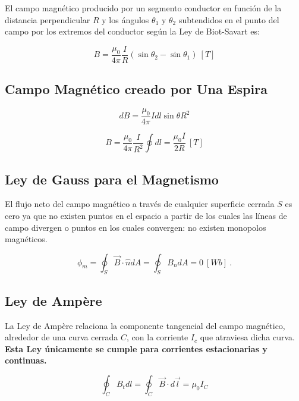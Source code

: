 \documentclass{tufte-handout}
\begin{document}
El campo magnético producido por un segmento conductor en función de la distancia perpendicular $R$ y los ángulos $\theta_1$ y $\theta_2$ subtendidos en el punto del campo por los extremos del conductor según la Ley de Biot-Savart es:

\begin{equation}
B = \frac{\mu_0}{4\pi}\frac{I}{R}(\sin{\theta_2}-\sin{\theta_1})~[T]
\end{equation}

\subsection{Campo Magnético creado por Una Espira}

\begin{equation}
dB = \frac{\mu_0}{4\pi}{Idl\sin{\theta}}{R^2}
\end{equation}

\begin{equation}
B = \frac{\mu_0}{4\pi}\frac{I}{R^2}\oint dl = \frac{\mu_0 I}{2R}~[T]
\end{equation}

\subsection{Ley de Gauss para el Magnetismo}

El flujo neto del campo magnético a través de cualquier superficie cerrada $S$ es cero ya que no existen puntos en el espacio a partir de los cuales las líneas de campo divergen o puntos en los cuales convergen: no existen monopolos magnéticos.

\begin{equation}
\phi_m = \oint_S \vec{B}\cdot\hat{n}dA = \oint_S B_ndA = 0~[Wb]~.
\end{equation}

\subsection{Ley de Ampère}

La Ley de Ampère relaciona la componente tangencial del campo magnético, alrededor de una curva cerrada $C$, con la corriente $I_c$ que atraviesa dicha curva. \textbf{Esta Ley únicamente se cumple para corrientes estacionarias y continuas.}

\begin{equation}
\oint_C B_t dl = \oint_C \vec{B}\cdot d\vec{l} = \mu_0 I_C
\end{equation}
\end{document}
